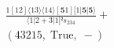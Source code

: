 \documentclass[varwidth, border=5pt]{standalone}
\begin{document}
\begin{my}
$\begin{gathered}
\scriptscriptstyle\frac{1[12]⟨13⟩⟨14⟩[𝟓1][1|𝟓|𝟓⟩}{⟨1|2+3|1]²s_{234}} +\\
\scriptscriptstyle(43215,\;\text{True},\;-) \phantom{+}
\end{gathered}$
\end{my}
\end{document}
